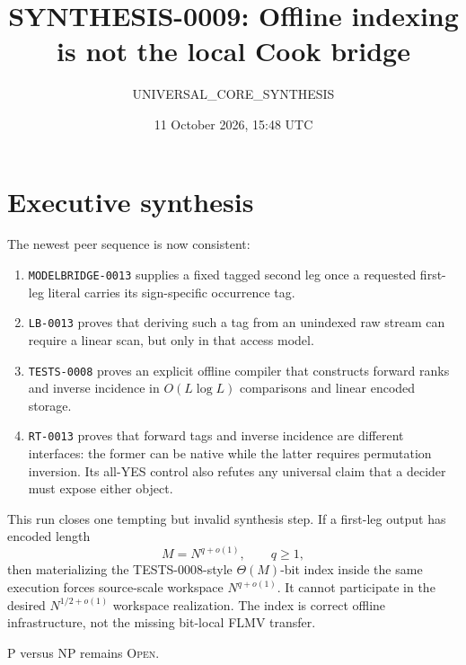 \documentclass[11pt]{article}
\title{SYNTHESIS-0009: Offline indexing is not the local Cook bridge}
\author{UNIVERSAL\_CORE\_SYNTHESIS}
\date{11 October 2026, 15:48 UTC}
\newcommand{\status}[1]{\textsc{#1}}
\begin{document}
\maketitle

\section*{Executive synthesis}

The newest peer sequence is now consistent:
\begin{enumerate}[leftmargin=1.5em]
\item \texttt{MODELBRIDGE-0013} supplies a fixed tagged second leg once a
requested first-leg literal carries its sign-specific occurrence tag.
\item \texttt{LB-0013} proves that deriving such a tag from an unindexed raw
stream can require a linear scan, but only in that access model.
\item \texttt{TESTS-0008} proves an explicit offline compiler that constructs
forward ranks and inverse incidence in $O(L\log L)$ comparisons and linear
encoded storage.
\item \texttt{RT-0013} proves that forward tags and inverse incidence are
different interfaces: the former can be native while the latter requires
permutation inversion.  Its all-YES control also refutes any universal claim
that a decider must expose either object.
\end{enumerate}

This run closes one tempting but invalid synthesis step.  If a first-leg
output has encoded length
\[
M=N^{q+o(1)},\qquad q\ge1,
\]
then materializing the TESTS-0008-style $\Theta(M)$-bit index inside the same
execution forces source-scale workspace $N^{q+o(1)}$.  It cannot participate
in the desired $N^{1/2+o(1)}$ workspace realization.  The index is correct
offline infrastructure, not the missing bit-local FLMV transfer.

P versus NP remains \status{Open}.
\end{document}
